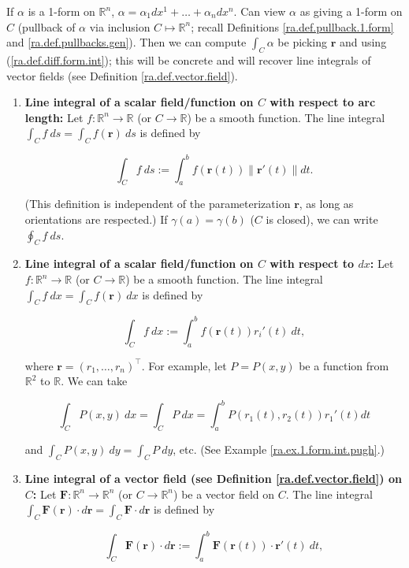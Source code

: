 If \(\alpha\) is a 1-form on \(\mathbb{R}^n\), \(\alpha = \alpha_1 dx^1 + \ldots + \alpha_n dx^n\). Can view \(\alpha\) as giving a 1-form on \(C\) (pullback of \(\alpha\) via inclusion \(C \mapsto \mathbb{R}^n\); recall Definitions \ref{ra.def.pullback.1.form} and \ref{ra.def.pullbacks.gen}). Then we can compute \(\int_C \alpha\) be picking \(\boldsymbol{r}\) and using (\ref{ra.def.diff.form.int}); this will be concrete and will recover line integrals of vector fields (see Definition \ref{ra.def.vector.field}). 

\begin{definition}\label{ra.def.line.int.calc.stew}

\begin{enumerate}

\item \textbf{Line integral of a scalar field/function on \(C\) with respect to arc length:} Let \(f: \mathbb{R}^n \to \mathbb{R}\) (or \(C \to \mathbb{R}\)) be a smooth function. The line integral \(\int_C f \ ds = \int_C f(\boldsymbol{r}) \ ds\) is defined by 

\[
\int_C f \ ds := \int_a^b f(\boldsymbol{r}(t)) \lVert \boldsymbol{r}'(t) \rVert dt.
\]

(This definition is independent of the parameterization \(\boldsymbol{r}\), as long as orientations are respected.) If \(\gamma(a) = \gamma(b)\) (\(C\) is closed), we can write \(\oint_C f \ ds\).

\item  \textbf{Line integral of a scalar field/function on \(C\) with respect to \(dx\):} Let \(f: \mathbb{R}^n \to \mathbb{R}\) (or \(C\to \mathbb{R}\)) be a smooth function. The line integral \(\int_C f \ dx = \int_C f(\boldsymbol{r}) \ dx\) is defined by 

\[
\int_C f \ dx:= \int_a^b f(\boldsymbol{r}(t)) r_i'(t)\ dt,
\]

where \(\boldsymbol{r} = (r_1, \ldots, r_n)^\top\). For example, let \(P = P(x,y)\) be a function from \(\mathbb{R}^2\) to \(\mathbb{R}\). We can take 

\[
\int_C P(x,y) \ dx = \int_C P \ dx = \int_a^b P(r_1(t), r_2(t)) r_1'(t) dt
\]

and \(\int_C P(x,y) \ dy = \int_C P \ dy\), etc. (See Example \ref{ra.ex.1.form.int.pugh}.)

\item  \textbf{Line integral of a vector field (see Definition \ref{ra.def.vector.field}) on \(C\):} Let \(\boldsymbol{F}: \mathbb{R}^n \to \mathbb{R}^n\) (or \(C \to \mathbb{R}^n\)) be a vector field on \(C\). The line integral \(\int_C \boldsymbol{F}(\boldsymbol{r}) \cdot d\boldsymbol{r} = \int_C \boldsymbol{F} \cdot d\boldsymbol{r} \) is defined by 

\[
\int_C \boldsymbol{F}(\boldsymbol{r}) \cdot d\boldsymbol{r} := \int_a^b \boldsymbol{F}(\boldsymbol{r}(t)) \cdot \boldsymbol{r}'(t) \ dt,
\]

\end{enumerate}

\end{definition}

